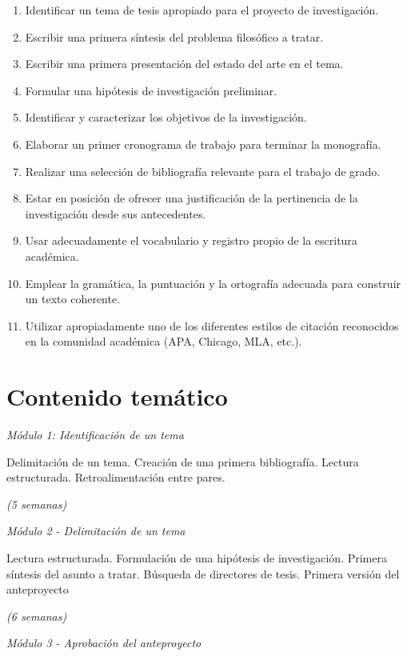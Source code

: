 \documentclass[]{article}
\begin{document}
\begin{enumerate}
\def\labelenumi{\arabic{enumi}.}
\item
  Identificar un tema de tesis apropiado para el proyecto de
  investigación.
\item
  Escribir una primera síntesis del problema filosófico a tratar.
\item
  Escribir una primera presentación del estado del arte en el tema.
\item
  Formular una hipótesis de investigación preliminar.
\item
  Identificar y caracterizar los objetivos de la investigación.
\item
  Elaborar un primer cronograma de trabajo para terminar la monografía.
\item
  Realizar una selección de bibliografía relevante para el trabajo de
  grado.
\item
  Estar en posición de ofrecer una justificación de la pertinencia de la
  investigación desde sus antecedentes.
\item
  Usar adecuadamente el vocabulario y registro propio de la escritura
  académica.
\item
  Emplear la gramática, la puntuación y la ortografía adecuada para
  construir un texto coherente.
\item
  Utilizar apropiadamente uno de los diferentes estilos de citación
  reconocidos en la comunidad académica (APA, Chicago, MLA, etc.).
\end{enumerate}

\section{Contenido temático}\label{contenido-tematico}

\emph{Módulo 1: Identificación de un tema}

Delimitación de un tema. Creación de una primera bibliografía. Lectura
estructurada. Retroalimentación entre pares.

\emph{(5 semanas)}

\emph{Módulo 2 - Delimitación de un tema}

Lectura estructurada. Formulación de una hipótesis de investigación.
Primera síntesis del asunto a tratar. Búsqueda de directores de tesis.
Primera versión del anteproyecto

\emph{(6 semanas)}

\emph{Módulo 3 - Aprobación del anteproyecto}
\end{document}
